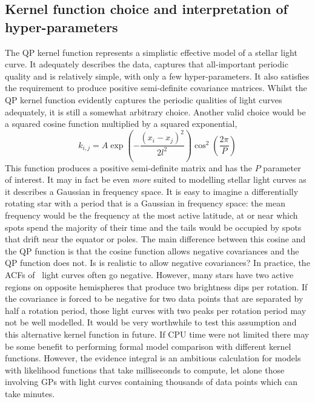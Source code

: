 \subsection{Kernel function choice and interpretation of hyper-parameters}
The QP kernel function represents a simplistic effective model of a stellar
light curve.
It adequately describes the data, captures that all-important periodic quality
and is relatively simple, with only a few hyper-parameters.
It also satisfies the requirement to produce positive semi-definite covariance
matrices.
Whilst the QP kernel function evidently captures the periodic qualities of
light curves adequately, it is still a somewhat arbitrary choice.
Another valid choice would be a squared cosine function multiplied by a
squared exponential,
\begin{equation}
k_{i,j} = A \exp \left(-\frac{(x_i - x_j)^2}{2l^2}\right)
\cos^2\left(\frac{2\pi}{P}\right)
\end{equation}
\label{eq:cos_kernel}
This function produces a positive semi-definite matrix and has the $P$
parameter of interest.
It may in fact be even {\it more} suited to modelling stellar
light curves as it describes a Gaussian in frequency space.
It is easy to imagine a differentially rotating star with a period that is a
Gaussian in frequency space: the mean frequency would be the frequency at the
most active latitude, at or near which spots spend the majority of their time
and the tails would be occupied by spots that drift near the equator or poles.
The main difference between this cosine and the QP function is that the cosine
function allows negative covariances and the QP function does not.
Is is realistic to allow negative covariances?
In practice, the ACFs of \Kepler\ light curves often go negative.
However, many stars have two active regions on opposite hemispheres that
produce two brightness dips per rotation.
If the covariance is forced to be negative for two data points that are
separated by half a rotation period, those light curves with two peaks per
rotation period may not be well modelled.
It would be very worthwhile to test this assumption and this alternative
kernel function in future.
If CPU time were not limited there may be some benefit to performing formal
model comparison with different kernel functions.
However, the evidence integral is an ambitious calculation for models with
likelihood functions that take milliseconds to compute, let alone those
involving GPs with light curves containing thousands of data points which can
take minutes.

